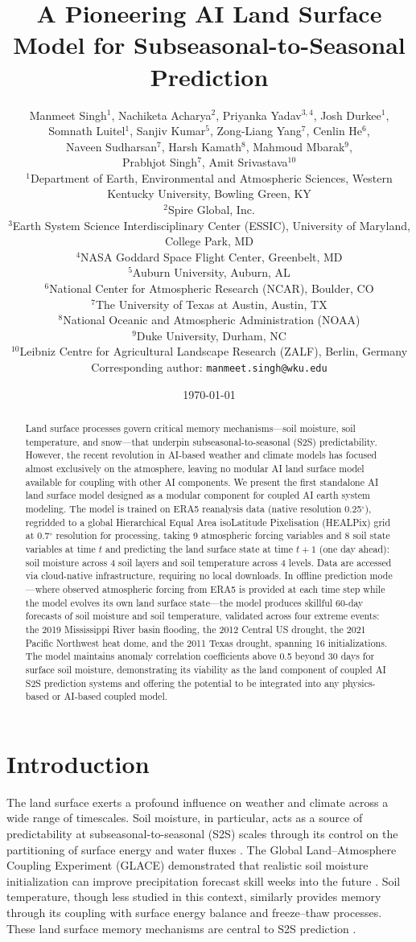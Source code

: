 \documentclass[11pt]{article}
\title{A Pioneering AI Land Surface Model for Subseasonal-to-Seasonal Prediction}
\author{\parbox{0.9\textwidth}{%
\centering
Manmeet Singh$^{1}$, Nachiketa Acharya$^{2}$, Priyanka Yadav$^{3,4}$, Josh Durkee$^{1}$, \\
Somnath Luitel$^{1}$, Sanjiv Kumar$^{5}$, Zong-Liang Yang$^{7}$, Cenlin He$^{6}$, \\
Naveen Sudharsan$^{7}$, Harsh Kamath$^{8}$, Mahmoud Mbarak$^{9}$, \\
Prabhjot Singh$^{7}$, Amit Srivastava$^{10}$
\\[12pt]
{\small
$^{1}$Department of Earth, Environmental and Atmospheric Sciences, Western Kentucky University, Bowling Green, KY \\
$^{2}$Spire Global, Inc. \\
$^{3}$Earth System Science Interdisciplinary Center (ESSIC), University of Maryland, College Park, MD \\
$^{4}$NASA Goddard Space Flight Center, Greenbelt, MD \\
$^{5}$Auburn University, Auburn, AL \\
$^{6}$National Center for Atmospheric Research (NCAR), Boulder, CO \\
$^{7}$The University of Texas at Austin, Austin, TX \\
$^{8}$National Oceanic and Atmospheric Administration (NOAA) \\
$^{9}$Duke University, Durham, NC \\
$^{10}$Leibniz Centre for Agricultural Landscape Research (ZALF), Berlin, Germany \\[8pt]
Corresponding author: \texttt{manmeet.singh@wku.edu}
}
}}
\date{\today}
\begin{document}
\maketitle

\begin{abstract}
Land surface processes govern critical memory mechanisms---soil moisture, soil temperature, and snow---that underpin subseasonal-to-seasonal (S2S) predictability. However, the recent revolution in AI-based weather and climate models has focused almost exclusively on the atmosphere, leaving no modular AI land surface model available for coupling with other AI components. We present the first standalone AI land surface model designed as a modular component for coupled AI earth system modeling. The model is trained on ERA5 reanalysis data (native resolution 0.25$^\circ$), regridded to a global Hierarchical Equal Area isoLatitude Pixelisation (HEALPix) grid at 0.7$^\circ$ resolution for processing, taking 9 atmospheric forcing variables and 8 soil state variables at time $t$ and predicting the land surface state at time $t+1$ (one day ahead): soil moisture across 4 soil layers and soil temperature across 4 levels. Data are accessed via cloud-native infrastructure, requiring no local downloads. In offline prediction mode---where observed atmospheric forcing from ERA5 is provided at each time step while the model evolves its own land surface state---the model produces skillful 60-day forecasts of soil moisture and soil temperature, validated across four extreme events: the 2019 Mississippi River basin flooding, the 2012 Central US drought, the 2021 Pacific Northwest heat dome, and the 2011 Texas drought, spanning 16 initializations. The model maintains anomaly correlation coefficients above 0.5 beyond 30 days for surface soil moisture, demonstrating its viability as the land component of coupled AI S2S prediction systems and offering the potential to be integrated into any physics-based or AI-based coupled model.
\end{abstract}

\section{Introduction}
\label{sec:intro}

The land surface exerts a profound influence on weather and climate across a wide range of timescales. Soil moisture, in particular, acts as a source of predictability at subseasonal-to-seasonal (S2S) scales through its control on the partitioning of surface energy and water fluxes \citep{koster2004glace, seneviratne2010landclimate, dirmeyer2011landatm}. The Global Land--Atmosphere Coupling Experiment (GLACE) demonstrated that realistic soil moisture initialization can improve precipitation forecast skill weeks into the future \citep{koster2004glace}. Soil temperature, though less studied in this context, similarly provides memory through its coupling with surface energy balance and freeze--thaw processes. These land surface memory mechanisms are central to S2S prediction \citep{vitart2017s2s, merryfield2020s2s}.
\end{document}
